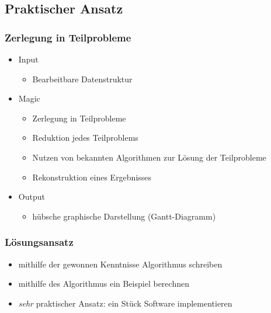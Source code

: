 \documentclass[%
	handout,
	compressed
]{beamer}
\begin{document}
	\subsection{Praktischer Ansatz}
		\begin{frame}
			\frametitle{Zerlegung in Teilprobleme}
			\pause
			\begin{itemize}
				\item Input
					\begin{itemize}
						\item Bearbeitbare Datenstruktur
					\end{itemize}\pause
				\item Magic
					\begin{itemize}
						\item Zerlegung in Teilprobleme
						\item Reduktion jedes Teilproblems
						\item Nutzen von bekannten Algorithmen zur Lösung der Teilprobleme
						\item Rekonstruktion eines Ergebnisses
					\end{itemize}\pause
				\item Output
					\begin{itemize}
						\item hübsche graphische Darstellung (Gantt-Diagramm)
					\end{itemize}
			\end{itemize}
		\end{frame}
		\begin{frame}
			\frametitle{Lösungsansatz}
			\begin{itemize}
				\item mithilfe der gewonnen Kenntnisse Algorithmus schreiben
				\item mithilfe des Algorithmus ein Beispiel berechnen
				\item \textit{sehr} praktischer Ansatz: ein Stück Software implementieren
			\end{itemize}
		\end{frame}
\end{document}
